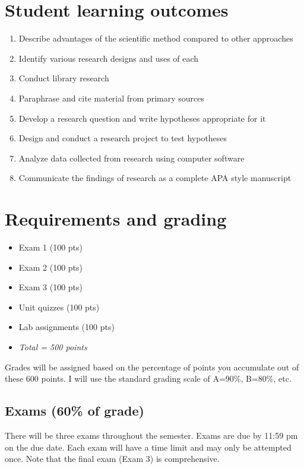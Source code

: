 \documentclass[10pt]{article}
\begin{document}
\section*{Student learning outcomes}
\label{sec-4}

\begin{enumerate}
\item Describe advantages of the scientific method compared to other approaches
\item Identify various research designs and uses of each
\item Conduct library research
\item Paraphrase and cite material from primary sources
\item Develop a research question and write hypotheses appropriate for it
\item Design and conduct a research project to test hypotheses
\item Analyze data collected from research using computer software
\item Communicate the findings of research as a complete APA style manuscript
\end{enumerate}

\section*{Requirements and grading}
\label{sec-5}

\begin{itemize}
\item Exam 1 (100 pts)
\item Exam 2 (100 pts)
\item Exam 3 (100 pts)
\item Unit quizzes (100 pts)
\item Lab assignments (100 pts)
\item \emph{Total = 500 points}
\end{itemize}

Grades will be assigned based on the percentage of points you accumulate out of these 600 points.  I will use the standard grading scale of A=90\%, B=80\%, etc.

\subsection*{Exams (60\% of grade)}
\label{sec-5-1}
There will be three exams throughout the semester.  Exams are due by 11:59 pm on the due date.  Each exam will have a time limit and may only be attempted once.  Note that the final exam (Exam 3) is comprehensive.
\end{document}
